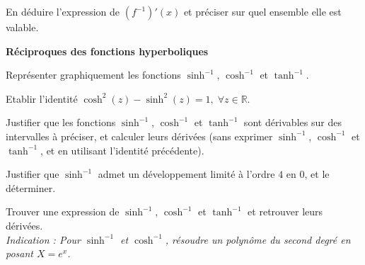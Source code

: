 \documentclass[10pt,a4paper]{article}
\begin{document}
\q En déduire l'expression de \( (f^{-1})'(x) \) et préciser sur quel ensemble elle est valable.

\bigskip
\textbf{Réciproques des fonctions hyperboliques}

\q Représenter graphiquement les fonctions $\sinh^{-1}$, $\cosh^{-1}$ et $\tanh^{-1}$.

\q Etablir l'identité $\cosh^2(z) - \sinh^2(z) = 1,\; \forall z \in \mathbb{R}$.

\q Justifier que les fonctions $\sinh^{-1}$, $\cosh^{-1}$ et $\tanh^{-1}$ sont dérivables sur des
intervalles à préciser, et calculer leurs dérivées (sans exprimer $\sinh^{-1}$, $\cosh^{-1}$ et
$\tanh^{-1}$, et en utilisant l'identité précédente).

\q Justifier que $\sinh^{-1}$ admet un développement limité à l'ordre $4$ en $0$, et le déterminer.

\q Trouver une expression de $\sinh^{-1}$, $\cosh^{-1}$ et $\tanh^{-1}$ et retrouver leurs
dérivées.\\
\emph{\small Indication : Pour $\sinh^{-1}$ et $\cosh^{-1}$, résoudre un polynôme du second degré en
posant $X = e^x$.}
\end{document}
